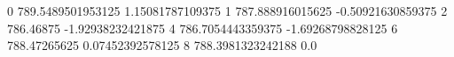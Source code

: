 0 789.5489501953125 1.15081787109375
1 787.888916015625 -0.50921630859375
2 786.46875 -1.92938232421875
4 786.7054443359375 -1.69268798828125
6 788.47265625 0.07452392578125
8 788.3981323242188 0.0
